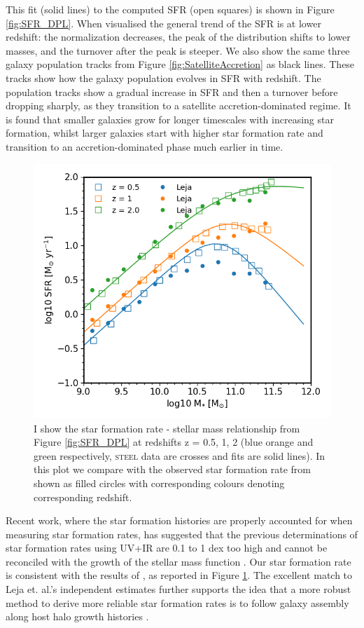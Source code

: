 This fit (solid lines) to the computed SFR (open squares) is shown in Figure \ref{fig:SFR_DPL}. When visualised the general trend of the SFR is at lower redshift: the normalization decreases, the peak of the distribution shifts to lower masses, and the turnover after the peak is steeper. We also show the same three galaxy population tracks from Figure \ref{fig:SatelliteAccretion} as black lines. These tracks show how the galaxy population evolves in SFR with redshift. The population tracks show a gradual increase in SFR and then a turnover before dropping sharply, as they transition to a satellite accretion-dominated regime. It is found that smaller galaxies grow for longer timescales with increasing star formation, whilst larger galaxies start with higher star formation rate and transition to an accretion-dominated phase much earlier in time.

\begin{figure}[h]
	\centering
	\includegraphics[width = 0.8\linewidth]{Figures/Chapter4/HMC_DPL_wLeja.png}
    \caption{I show the star formation rate - stellar mass relationship from Figure \ref{fig:SFR_DPL} at redshifts z = 0.5, 1, 2 (blue orange and green respectively, \textsc{steel} data are crosses and fits are solid lines). In this plot we compare with the observed star formation rate from \citet{Leja2019AnSurvey} shown as filled circles with corresponding colours denoting corresponding redshift.}
	\label{fig:SFR_L18}
\end{figure}

Recent work, where the star formation histories are properly accounted for when measuring star formation rates, has suggested that the previous determinations of star formation rates using UV+IR are 0.1 to 1 dex too high \citep{Leja2019AnSurvey} and cannot be reconciled with the growth of the stellar mass function \citep{Leja2015ReconcilingFunction, Lapi2017StellarEquation}. Our star formation rate is consistent with the results of \citet{Leja2019AnSurvey}, as reported in Figure \ref{fig:SFR_L18}. The excellent match to Leja et. al.'s independent estimates further supports the idea that a more robust method to derive more reliable star formation rates is to follow galaxy assembly along host halo growth histories \citep[see e.g.,][]{Moster2018Emerge10}. 

